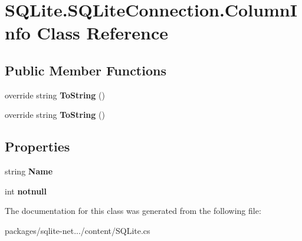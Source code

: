 \hypertarget{classSQLite_1_1SQLiteConnection_1_1ColumnInfo}{\section{S\-Q\-Lite.\-S\-Q\-Lite\-Connection.\-Column\-Info Class Reference}
\label{classSQLite_1_1SQLiteConnection_1_1ColumnInfo}
}
\subsection*{Public Member Functions}
\begin{DoxyCompactItemize}
\item 
\hypertarget{classSQLite_1_1SQLiteConnection_1_1ColumnInfo_af1ba3d13d1ccc9d2389c086f4e64610c}{override string {\bfseries To\-String} ()}\label{classSQLite_1_1SQLiteConnection_1_1ColumnInfo_af1ba3d13d1ccc9d2389c086f4e64610c}

\item 
\hypertarget{classSQLite_1_1SQLiteConnection_1_1ColumnInfo_af1ba3d13d1ccc9d2389c086f4e64610c}{override string {\bfseries To\-String} ()}\label{classSQLite_1_1SQLiteConnection_1_1ColumnInfo_af1ba3d13d1ccc9d2389c086f4e64610c}

\end{DoxyCompactItemize}
\subsection*{Properties}
\begin{DoxyCompactItemize}
\item 
\hypertarget{classSQLite_1_1SQLiteConnection_1_1ColumnInfo_abb54a8246c842238b86ae27252ed9590}{string {\bfseries Name}}\label{classSQLite_1_1SQLiteConnection_1_1ColumnInfo_abb54a8246c842238b86ae27252ed9590}

\item 
\hypertarget{classSQLite_1_1SQLiteConnection_1_1ColumnInfo_a830462120a513cacefa6c59550e06fd5}{int {\bfseries notnull}}\label{classSQLite_1_1SQLiteConnection_1_1ColumnInfo_a830462120a513cacefa6c59550e06fd5}

\end{DoxyCompactItemize}


The documentation for this class was generated from the following file\-:\begin{DoxyCompactItemize}
\item 
packages/sqlite-\/net.../content/S\-Q\-Lite.\-cs\end{DoxyCompactItemize}
